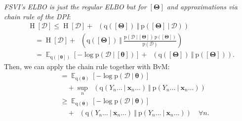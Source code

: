 \documentclass[25pt,a0paper,landscape]{tikzposter}
\DeclareMathOperator{\opExpectation}{\mathbb{E}}
\newcommand{\E}[2]{\opExpectation_{#1} \left [ #2 \right ]}
\newcommand{\MidSymbol}[1][]{\:#1\:}
\newcommand{\given}{\MidSymbol[\vert]}
\DeclareMathOperator{\opEntropy}{H}
\newcommand{\Hof}[1]{\opEntropy[#1]}
\DeclareMathOperator{\opKale}{D_\mathrm{KL}}
\newcommand{\Kale}[2]{\opKale(#1 \MidSymbol[\Vert] #2)}
\newcommand{\opp}{\mathrm{p}}
\newcommand{\pof}[1]{\opp(#1)}
\newcommand{\opq}{\mathrm{q}}
\newcommand{\qof}[1]{\opq(#1)}
\newcommand{\w}{\boldsymbol{\theta}}
\newcommand{\W}{\boldsymbol{\Theta}}
\newcommand{\Dany}{\mathcal{D}}
\newcommand{\Y}{Y}
\newcommand{\x}{\boldsymbol{x}}
\begin{document}
\begin{columns}
{\begin{multicols}{2}
\begin{theorybox}[title=Bernstein von Mises' Theorem]
    \end{theorybox}
    \begin{proofbox}[title=Function-Space Variational Inference \& ELBO]
      \emph{FSVI's ELBO is just the regular ELBO but for $[\W]$ and approximations via chain rule of the DPI}:
      \begin{align*}
        &\Hof{\Dany} \le \Hof{\Dany} + \Kale{\qof{[\W]}}{\pof{[\W] \given \Dany}} \\
        &\quad = \Hof{\Dany} + \Kale{\qof{[\W]}}{\frac{\pof{\Dany \given [\W]} \, \pof{[\W]}}{\pof{\Dany}}} \\
        &\quad = 
        \E{\qof{[\w]}}{-\log \pof{\Dany \given [\w]}} + \Kale{\qof{[\W]}}{\pof{[\W]}}.
      \end{align*}
      Then, we can apply the chain rule together with BvM:
      \begin{align*}
        &\quad = \E{\qof{\w}}{-\log \pof{\Dany \given \w}} \\
        &\quad \quad + \sup_n \Kale{\qof{\Y_n... \given \x_n...}}{\pof{\Y_n... \given \x_n...}} \\
        &\quad \ge \E{\qof{\w}}{-\log \pof{\Dany \given \w}} \\
        &\quad \quad + \Kale{\qof{\Y_n... \given \x_n...}}{\pof{\Y_n... \given \x_n...}} \quad \forall n.
      \end{align*}
    \end{proofbox}
    \end{multicols}
}
\end{columns}


\end{document}
